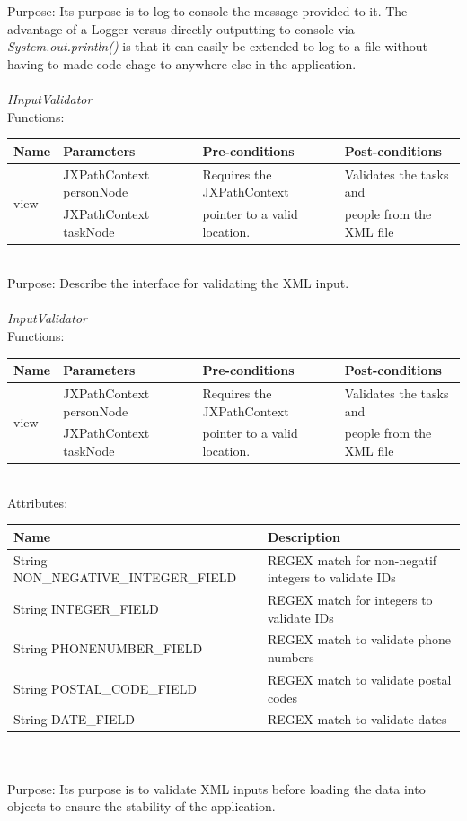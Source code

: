 Purpose: Its purpose is to log to console the message provided to it. The advantage of a Logger versus directly outputting to console via \emph{System.out.println()} is that it can easily be extended to log to a file without having to made code chage to anywhere else in the application.
\\
\\

\emph{IInputValidator}\\
Functions:\\
\begin{tabular}{| l | l | l | l |}
\hline
Name & Parameters & Pre-conditions & Post-conditions\\
\hline
\multirow{2}{*}{view} & JXPathContext personNode       & Requires the JXPathContext	&  Validates the tasks and\\							
			 & JXPathContext taskNode           & pointer to a valid location.        & people from the XML file
\\
\hline
\end{tabular}
\\

Purpose: Describe the interface for validating the XML input.
\\
\\
\emph{InputValidator}\\
Functions:\\
\begin{tabular}{| l | l | l | l |}
\hline
Name & Parameters & Pre-conditions & Post-conditions\\
\hline
\multirow{2}{*}{view} & JXPathContext personNode       & Requires the JXPathContext	&  Validates the tasks and\\							
			 & JXPathContext taskNode           & pointer to a valid location.        & people from the XML file
\\
\hline
\end{tabular}
\\

Attributes:\\
\begin{tabular}{| l | l |}
\hline
 Name                                                        & Description\\
\hline
String NON\_NEGATIVE\_INTEGER\_FIELD  & REGEX match for non-negatif integers to validate IDs\\
\hline
String INTEGER\_FIELD                               & REGEX match for integers to validate IDs\\
\hline
String PHONENUMBER\_FIELD                    & REGEX match to validate phone numbers\\
\hline
String POSTAL\_CODE\_FIELD                    &  REGEX match to validate postal codes\\
\hline
String DATE\_FIELD                                    &  REGEX match to validate dates\\
\hline
\end{tabular}\\
\\

Purpose: Its purpose is to validate XML inputs before loading the data into objects to ensure the stability of the application.
\\
\\